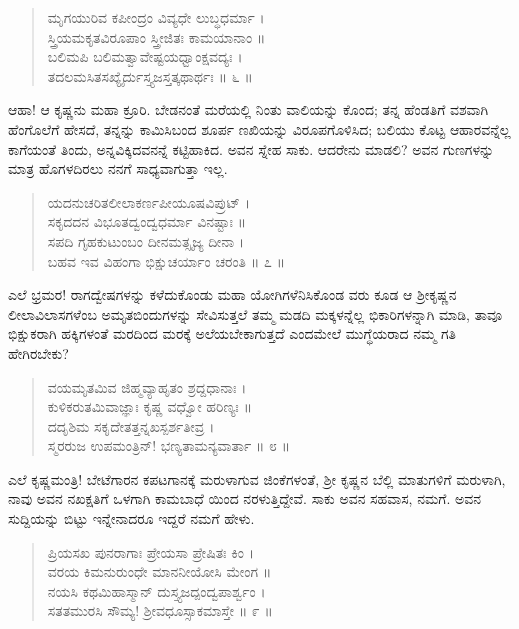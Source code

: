 \begin{verse}
ಮೃಗಯುರಿವ ಕಪೀಂದ್ರಂ ವಿವ್ಯಧೇ ಲುಬ್ಧಧರ್ಮಾ ।\\ಸ್ತ್ರಿಯಮಕೃತವಿರೂಪಾಂ ಸ್ತ್ರೀಜಿತಃ ಕಾಮಯಾನಾಂ ॥\\ಬಲಿಮಪಿ ಬಲಿಮತ್ವಾವೇಷ್ಟಯಧ್ವಾಂಕ್ಷವದ್ಯಃ ।\\ತದಲಮಸಿತಸಖ್ಯೈರ್ದುಸ್ತ್ಯಜಸ್ತತ್ಕಥಾರ್ಥಃ \num{॥ ೬ ॥}
\end{verse}

ಆಹಾ! ಆ ಕೃಷ್ಣನು ಮಹಾ ಕ್ರೂರಿ. ಬೇಡನಂತೆ ಮರೆಯಲ್ಲಿ ನಿಂತು ವಾಲಿಯನ್ನು ಕೊಂದ; ತನ್ನ ಹೆಂಡತಿಗೆ ವಶವಾಗಿ ಹೆಂಗೊಲೆಗೆ ಹೇಸದೆ, ತನ್ನನ್ನು ಕಾಮಿಸಿಬಂದ ಶೂರ್ಪ ಣಖಿಯನ್ನು ವಿರೂಪಗೊಳಿಸಿದ; ಬಲಿಯು ಕೊಟ್ಟ ಆಹಾರವನ್ನೆಲ್ಲ ಕಾಗೆಯಂತೆ ತಿಂದು, ಅನ್ನವಿಕ್ಕಿದವನನ್ನೆ ಕಟ್ಟಿಹಾಕಿದ. ಅವನ ಸ್ನೇಹ ಸಾಕು. ಆದರೇನು ಮಾಡಲಿ? ಅವನ ಗುಣಗಳನ್ನು ಮಾತ್ರ ಹೊಗಳದಿರಲು ನನಗೆ ಸಾಧ್ಯವಾಗುತ್ತಾ ಇಲ್ಲ.

\begin{verse}
ಯದನುಚರಿತಲೀಲಾಕರ್ಣಪೀಯೂಷವಿಪ್ರುಟ್ ।\\ಸಕೃದದನ ವಿಭೂತದ್ವಂದ್ವಧರ್ಮಾ ವಿನಷ್ಟಾಃ ॥\\ಸಪದಿ ಗೃಹಕುಟುಂಬಂ ದೀನಮತ್ಸೃಜ್ಯ ದೀನಾ ।\\ಬಹವ ಇವ ವಿಹಂಗಾ ಭಿಕ್ಷುಚರ್ಯಾಂ ಚರಂತಿ \num{॥ ೭ ॥}
\end{verse}

ಎಲೆ ಭ್ರಮರ! ರಾಗದ್ವೇಷಗಳನ್ನು ಕಳೆದುಕೊಂಡು ಮಹಾ ಯೋಗಿಗಳೆನಿಸಿಕೊಂಡ ವರು ಕೂಡ ಆ ಶ್ರೀಕೃಷ್ಣನ ಲೀಲಾವಿಲಾಸಗಳೆಂಬ ಅಮೃತಬಿಂದುಗಳನ್ನು ಸೇವಿಸುತ್ತಲೆ ತಮ್ಮ ಮಡದಿ ಮಕ್ಕಳನ್ನೆಲ್ಲ ಭಿಕಾರಿಗಳನ್ನಾಗಿ ಮಾಡಿ, ತಾವೂ ಭಿಕ್ಷುಕರಾಗಿ ಹಕ್ಕಿಗಳಂತೆ ಮರದಿಂದ ಮರಕ್ಕೆ ಅಲೆಯಬೇಕಾಗುತ್ತದೆ ಎಂದಮೇಲೆ ಮುಗ್ಧೆಯರಾದ ನಮ್ಮ ಗತಿ ಹೇಗಿರಬೇಕು?

\begin{verse}
ವಯಮೃತಮಿವ ಜಿಹ್ಮವ್ಯಾಹೃತಂ ಶ್ರದ್ದಧಾನಾಃ ।\\ಕುಳಿಕರುತಮಿವಾಜ್ಞಾಃ ಕೃಷ್ಣ ವಧ್ವೋ ಹರಿಣ್ಯಃ ॥\\ದದೃಶಿಮ ಸಕೃದೇತತ್ತನ್ನಖಸ್ಪರ್ಶತೀವ್ರ ।\\ಸ್ಮರರುಜ ಉಪಮಂತ್ರಿನ್​! ಭಣ್ಯತಾಮನ್ಯವಾರ್ತಾ \num{॥ ೮ ॥}
\end{verse}

ಎಲೆ ಕೃಷ್ಣಮಂತ್ರಿ! ಬೇಟೆಗಾರನ ಕಪಟಗಾನಕ್ಕೆ ಮರುಳಾಗುವ ಜಿಂಕೆಗಳಂತೆ, ಶ್ರೀ ಕೃಷ್ಣನ ಬೆಲ್ಲಿ ಮಾತುಗಳಿಗೆ ಮರುಳಾಗಿ, ನಾವು ಅವನ ನಖಕ್ಷತಿಗೆ ಒಳಗಾಗಿ ಕಾಮಬಾಧೆ ಯಿಂದ ನರಳುತ್ತಿದ್ದೇವೆ. ಸಾಕು ಅವನ ಸಹವಾಸ, ನಮಗೆ. ಅವನ ಸುದ್ದಿಯನ್ನು ಬಿಟ್ಟು ಇನ್ನೇನಾದರೂ ಇದ್ದರೆ ನಮಗೆ ಹೇಳು.

\begin{verse}
ಪ್ರಿಯಸಖ ಪುನರಾಗಾಃ ಪ್ರೇಯಸಾ ಪ್ರೇಷಿತಃ ಕಿಂ ।\\ವರಯ ಕಿಮನುರುಂಧೇ ಮಾನನೀಯೋಸಿ ಮೇಂಗ ॥\\ನಯಸಿ ಕಥಮಿಹಾಸ್ಮಾನ್ ದುಸ್ತ್ಯಜದ್ಪಂದ್ವಪಾರ್ಶ್ವಂ ।\\ಸತತಮುರಸಿ ಸೌಮ್ಯ! ಶ್ರೀವಧೂಸ್ಸಾಕಮಾಸ್ತೇ \num{॥ ೯ ॥}
\end{verse}

